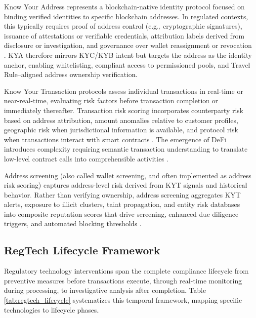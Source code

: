 \documentclass[conference,compsoc]{IEEEtran}
\begin{document}
Know Your Address represents a blockchain-native identity protocol focused on binding verified identities to specific blockchain addresses. In regulated contexts, this typically requires proof of address control (e.g., cryptographic signatures), issuance of attestations or verifiable credentials, attribution labels derived from disclosure or investigation, and governance over wallet reassignment or revocation \cite{reed2022decentralizedidentifiersdids,camenisch2001efficientsystemnontransferable}. KYA therefore mirrors KYC/KYB intent but targets the address as the identity anchor, enabling whitelisting, compliant access to permissioned pools, and Travel Rule–aligned address ownership verification.

Know Your Transaction protocols assess individual transactions in real-time or near-real-time, evaluating risk factors before transaction completion or immediately thereafter. Transaction risk scoring incorporates counterparty risk based on address attribution, amount anomalies relative to customer profiles, geographic risk when jurisdictional information is available, and protocol risk when transactions interact with smart contracts \cite{moser2014riskscoringbitcoin}. The emergence of DeFi introduces complexity requiring semantic transaction understanding to translate low-level contract calls into comprehensible activities \cite{chen2020understandingethereumgraph,sun2025ethereumfrauddetection}.

Address screening (also called wallet screening, and often implemented as address risk scoring) captures address-level risk derived from KYT signals and historical behavior. Rather than verifying ownership, address screening aggregates KYT alerts, exposure to illicit clusters, taint propagation, and entity risk databases into composite reputation scores that drive screening, enhanced due diligence triggers, and automated blocking thresholds \cite{moser2014riskscoringbitcoin,weber2019antimoneylaunderingbitcoin}.

\subsection{RegTech Lifecycle Framework}

Regulatory technology interventions span the complete compliance lifecycle from preventive measures before transactions execute, through real-time monitoring during processing, to investigative analysis after completion. Table \ref{tab:regtech_lifecycle} systematizes this temporal framework, mapping specific technologies to lifecycle phases.
\end{document}
